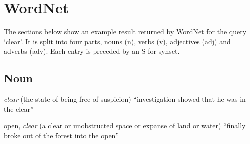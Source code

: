 
\chapter{WordNet}
\label{app:wordnet}

\vspace{5cm}


The sections below show an example result returned by WordNet for the query `clear'. It is split into four parts, nouns (n), verbs (v), adjectives (adj) and adverbs (adv). Each entry is preceded by an S for synset.


\section{Noun}
\begin{description}[leftmargin=1.5cm]
  \item [S: (n)] \emph{clear} (the state of being free of suspicion) ``investigation showed that he was in the clear''
  \item [S: (n)] open, \emph{clear} (a clear or unobstructed space or expanse of land or water) ``finally broke out of the forest into the open''
\end{description}


